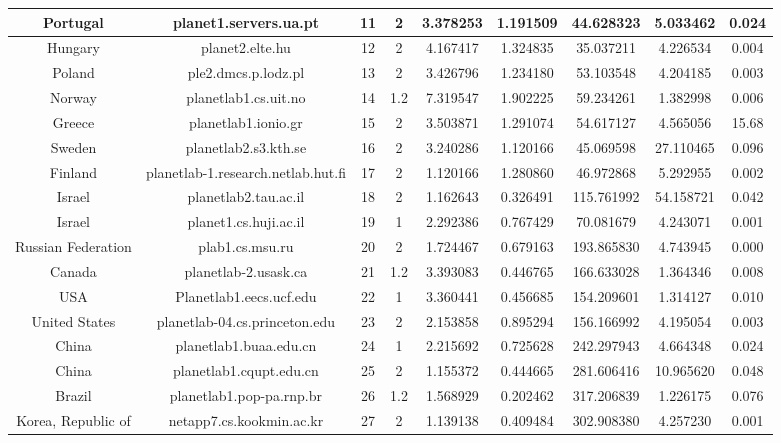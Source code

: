 \begin{center}
{\begin{longtable}{c c c c c c c c c}
        Portugal & planet1.servers.ua.pt                & 11  &  2 &3.378253&1.191509&44.628323&5.033462&0.024\\\hline
        Hungary & planet2.elte.hu                       & 12  &  2 &4.167417&1.324835&35.037211&4.226534&0.004\\\hline
        Poland & ple2.dmcs.p.lodz.pl                    & 13  &  2 &3.426796&1.234180&53.103548&4.204185&0.003\\\hline
        Norway & planetlab1.cs.uit.no                   & 14  &1.2 &7.319547&1.902225&59.234261&1.382998&0.006\\\hline
        Greece & planetlab1.ionio.gr                    & 15  &  2 &3.503871&1.291074&54.617127&4.565056&15.68\\\hline
        Sweden & planetlab2.s3.kth.se                   & 16  &  2 &3.240286&1.120166&45.069598&27.110465&0.096\\\hline
        Finland & planetlab-1.research.netlab.hut.fi    & 17  &  2 &1.120166&1.280860&46.972868&5.292955&0.002\\\hline
        Israel & planetlab2.tau.ac.il                   & 18  &  2 &1.162643&0.326491&115.761992&54.158721&0.042\\\hline
        Israel & planet1.cs.huji.ac.il                  & 19  &  1 &2.292386&0.767429&70.081679&4.243071&0.001\\\hline
        Russian Federation & plab1.cs.msu.ru            & 20  &  2 &1.724467&0.679163&193.865830&4.743945&0.000\\\hline
        Canada & planetlab-2.usask.ca                   & 21  &1.2 &3.393083&0.446765&166.633028&1.364346&0.008\\\hline
        USA & Planetlab1.eecs.ucf.edu                   & 22  &  1 &3.360441&0.456685&154.209601&1.314127&0.010\\\hline
        United States & planetlab-04.cs.princeton.edu   & 23  &  2 &2.153858&0.895294&156.166992&4.195054&0.003\\\hline
        China & planetlab1.buaa.edu.cn                  & 24  &  1 &2.215692&0.725628&242.297943&4.664348&0.024\\\hline
        China & planetlab1.cqupt.edu.cn                 & 25  &  2 &1.155372&0.444665&281.606416&10.965620&0.048\\\hline
        Brazil & planetlab1.pop-pa.rnp.br               & 26  &1.2 &1.568929&0.202462&317.206839&1.226175&0.076\\\hline
        Korea, Republic of & netapp7.cs.kookmin.ac.kr   & 27  &  2 &1.139138&0.409484&302.908380&4.257230&0.001\\\hline

\end{longtable}}
\end{center}
